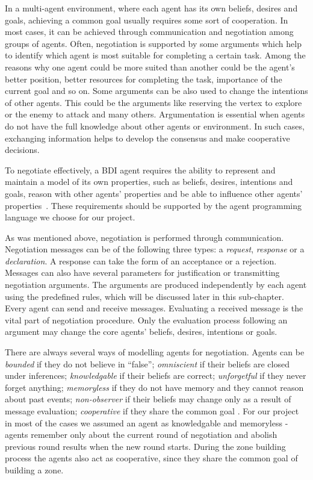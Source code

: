 In a multi-agent environment, where each agent has its own beliefs, desires and goals, achieving a common goal usually requires some sort of cooperation.
In most cases, it can be achieved through communication and negotiation among groups of agents.
Often, negotiation is supported by some arguments which help to identify which agent is most suitable for completing a certain task.
Among the reasons why one agent could be more suited than another could be the agent's better position, better resources for completing the task, importance of the current goal and so on.
Some arguments can be also used to change the intentions of other agents.
This could be the arguments like reserving the vertex to explore or the enemy to attack and many others.
Argumentation is essential when agents do not have the full knowledge about other agents or environment.
In such cases, exchanging information helps to develop the consensus and make cooperative decisions.

To negotiate effectively, a BDI agent requires the ability to represent and maintain a model of its own properties, such as beliefs, desires, intentions and goals, reason with other agents' properties and be able to influence other agents' properties~\cite{Kraus_98}.
These requirements should be supported by the agent programming language we choose for our project.

As was mentioned above, negotiation is performed through communication.
Negotiation messages can be of the following three types: a \emph{request}, \emph{response} or a \emph{declaration}.
A response can take the form of an acceptance or a rejection.
Messages can also have several parameters for justification or transmitting negotiation arguments.
The arguments are produced independently by each agent using the predefined rules, which will be discussed later in this sub-chapter.
Every agent can send and receive messages.
Evaluating a received message is the vital part of negotiation procedure.
Only the evaluation process following an argument may change the core agents' beliefs, desires, intentions or goals.

There are always several ways of modelling agents for negotiation.
Agents can be \emph{bounded} if they do not believe in ``false''; \emph{omniscient} if their beliefs are closed under inferences; \emph{knowledgable} if  their beliefs are correct; \emph{unforgetful} if they never forget anything; \emph{memoryless} if they do not have memory and they cannot reason about past events; \emph{non-observer} if their beliefs may change only as a result of message evaluation; \emph{cooperative} if they share the common goal \cite{Kraus_98}.
For our project in most of the cases we assumed an agent as knowledgable and memoryless - agents remember only about the current round of negotiation and abolish previous round results when the new round starts.
During the zone building process the agents also act as cooperative, since they share the common goal of building a zone.

